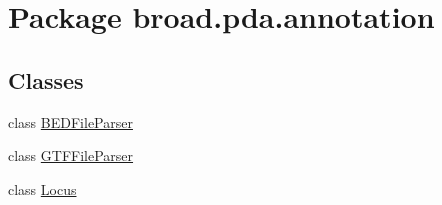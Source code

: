\hypertarget{namespacebroad_1_1pda_1_1annotation}{\section{Package broad.\+pda.\+annotation}
\label{namespacebroad_1_1pda_1_1annotation}
}
\subsection*{Classes}
\begin{DoxyCompactItemize}
\item 
class \hyperlink{classbroad_1_1pda_1_1annotation_1_1_b_e_d_file_parser}{B\+E\+D\+File\+Parser}
\item 
class \hyperlink{classbroad_1_1pda_1_1annotation_1_1_g_t_f_file_parser}{G\+T\+F\+File\+Parser}
\item 
class \hyperlink{classbroad_1_1pda_1_1annotation_1_1_locus}{Locus}
\end{DoxyCompactItemize}
